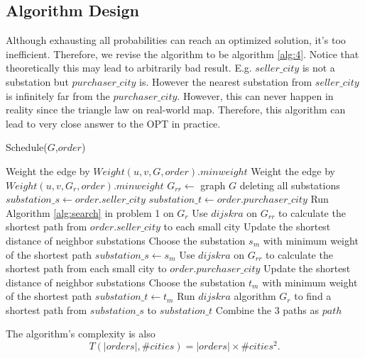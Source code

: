 \documentclass[11pt, a4paper]{article} %
\begin{document}
	
	\subsection{Algorithm Design}
	Although exhausting all probabilities can reach an optimized solution, it's too inefficient. Therefore, we revise the algorithm to be algorithm \ref{alg:4}. Notice that theoretically this may lead to arbitrarily bad result. E.g. $seller\_city$ is not a substation but $purchaser\_city$ is. However the nearest substation from $seller\_city$ is infinitely far from the $purchaser\_city$. However, this can never happen in reality since the triangle law on real-world map. Therefore, this algorithm can lead to very close answer to the OPT in practice.\\
	\begin{algorithm}[H]\label{alg:4}
		\caption{Schedule($G$,$order$)}
		\BlankLine
		{
			Weight the edge by $Weight(u,v,G,order).minweight$\;
		}
		{
			Weight the edge by $Weight(u,v,G_r,order).minweight$\;
		}
		$G_{rr}\leftarrow$ graph $G$ deleting all substations\;
		$substation\_s\leftarrow order.seller\_city$\;
		$substation\_t\leftarrow order.purchaser\_city$\;
		{
			Run Algorithm \ref{alg:search} in problem 1 on $G_r$\;
			\;
		}
		{
			Use $dijskra$ on $G_{rr}$ to calculate the shortest path from $order.seller\_city$ to each small city\;
			{
				Update the shortest distance of neighbor substations\;
			}
			Choose the substation $s_m$ with minimum weight of the shortest path\;
			$substation\_s\leftarrow s_m$\;
		}
		{
			Use $dijskra$ on $G_{rr}$ to calculate the shortest path from  each small city to $order.purchaser\_city$ \;
			{
				Update the shortest distance of neighbor substations\;
			}
			Choose the substation $t_m$ with minimum weight of the shortest path\;
			$substation\_t\leftarrow t_m$\;
		}
		Run $dijskra$ algorithm $G_r$ to find a shortest path from $substation\_s$ to $substation\_t$\;
		Combine the 3 paths as $path$\;	
		\;
	\end{algorithm}
	The algorithm's complexity is also
	$$
	T(|orders|,\#cities)=|orders|\times \#cities^2.
	$$
\end{document}
